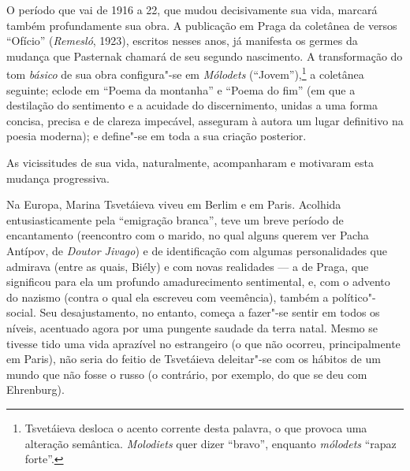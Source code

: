 O período que vai de 1916 a 22, que mudou decisivamente sua
vida, marcará também profundamente sua obra. A publicação em Praga da
coletânea de versos ``Ofício'' (\emph{Remesló}, 1923), escritos nesses anos, já
manifesta os germes da mudança que Pasternak chamará de seu segundo
nascimento. A transformação do tom \emph{básico} de sua obra
configura"-se em \emph{Mólodets} (``Jovem''),\footnote{Tsvetáieva
desloca o acento corrente desta palavra, o que provoca uma
alteração semântica. \emph{Molodiets} quer dizer ``bravo'',
enquanto \emph{mólodets} ``rapaz forte''.} a coletânea seguinte;
eclode em ``Poema da montanha'' e ``Poema do fim'' (em que a
destilação do sentimento e a acuidade do discernimento, unidas
a uma forma concisa, precisa e de clareza impecável, asseguram
à autora um lugar definitivo na poesia moderna); e define"-se
em toda a sua criação posterior.

As vicissitudes de sua vida, naturalmente, acompanharam e motivaram esta mudança progressiva.

Na Europa, Marina Tsvetáieva viveu em Berlim e em Paris. Acolhida
entusiasticamente pela ``emigração branca'', teve um breve período
de encantamento (reencontro com o marido, no qual alguns querem
ver Pacha Antípov, de \emph{Doutor Jivago}) e de identificação
com algumas personalidades que admirava (entre as quais, Biély)
e com novas realidades --- a de Praga, que significou para ela
um profundo amadurecimento sentimental, e, com o advento do
nazismo (contra o qual ela escreveu com veemência), também a
político"-social. Seu desajustamento, no entanto, começa a
fazer"-se sentir em todos os níveis, acentuado agora por uma
pungente saudade da terra natal. Mesmo se tivesse tido uma
vida aprazível no estrangeiro (o que não ocorreu, principalmente
em Paris), não seria do feitio de Tsvetáieva deleitar"-se com os
hábitos de um mundo que não fosse o russo (o contrário, por
exemplo, do que se deu com Ehrenburg).

